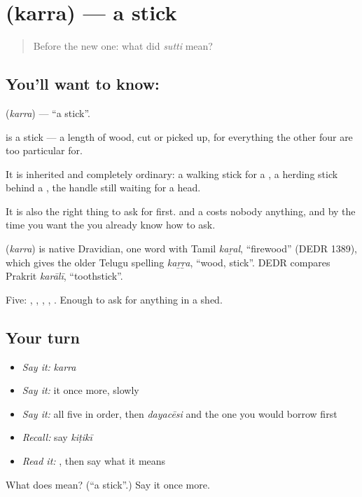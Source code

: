 \section[\texorpdfstring{\te{కర్ర} (karra)}{కర్ర (karra)}]{ (karra) — a stick}

\label{lesson:TE-C69-stick}



\begin{quote}
Before the new one: what did \emph{sutti} mean?
\end{quote}

\subsection*{You'll want to know: }
\textbf{} (\emph{karra}) — \textquotedblleft{}a stick\textquotedblright{}.

 is a stick — a length of wood, cut or picked up, for everything the other four are too particular for.

It is inherited and completely ordinary: a walking stick for a , a herding stick behind a , the handle still waiting for a  head.

It is also the right thing to ask for first.  and a  costs nobody anything, and by the time you want the  you already know how to ask.

\begin{cousinweb}
\textbf{} (\emph{karra}) is native Dravidian, one word with Tamil \emph{kaṟal}, \textquotedblleft{}firewood\textquotedblright{} (DEDR 1389), which gives the older Telugu spelling \emph{kaṟṟa}, \textquotedblleft{}wood, stick\textquotedblright{}. DEDR compares Prakrit \emph{karālī}, \textquotedblleft{}toothstick\textquotedblright{}.
\end{cousinweb}

\begin{grammarlens}[title={What you've built}]
Five: , , , , . Enough to ask for anything in a shed.
\end{grammarlens}

\subsection*{Your turn}
\begin{itemize}
\raggedright
  \item \emph{Say it:} \emph{karra}
  \item \emph{Say it:} it once more, slowly
  \item \emph{Say it:} all five in order, then \emph{dayacēsi} and the one you would borrow first
  \item \emph{Recall:} say \emph{kiṭikī}
  \item \emph{Read it:} \textbf{}, then say what it means
\end{itemize}

\begin{tcolorbox}[breakable,colback=teal!4,colframe=teal!35!black,title={Before you move on}]
What does  mean? (\textquotedblleft{}a stick\textquotedblright{}.) Say it once more.
\end{tcolorbox}
